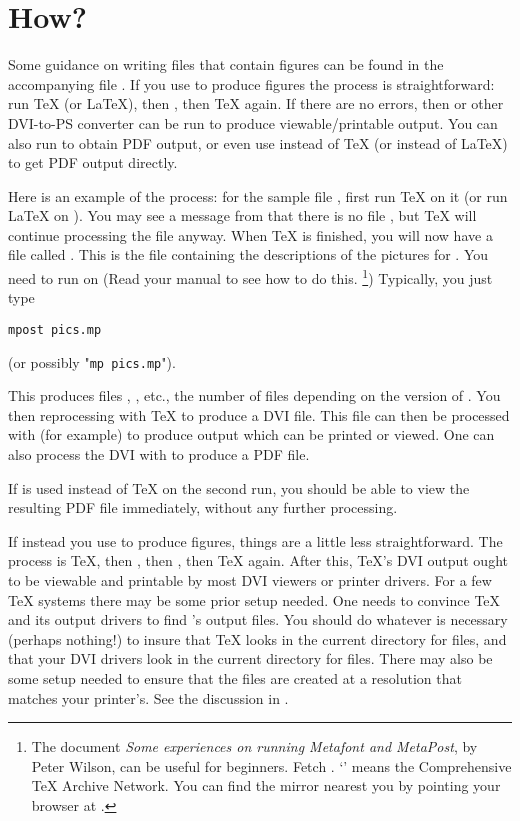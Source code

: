 \documentclass[letterpaper]{article}
\begin{document}
\section{How?}\label{process}

Some guidance on writing files that contain \mfp{} figures can be found
in the accompanying file . If you use \mfp{} to
produce \MP{} figures the process is straightforward: run \TeX{} (or
\LaTeX), then \MP{}, then \TeX{} again. If there are no errors, then
 or other DVI-to-PS converter can be run to produce
viewable\slash printable output. You can also run  to obtain PDF
output, or even use \pdfTeX{} instead of \TeX{} (or \pdfLaTeX{} instead
of \LaTeX{}) to get PDF output directly.

Here is an example of the process: for the sample file
, first run \TeX{} on it (or run \LaTeX{} on
). You may see a message from \mfp{} that there is
no file , but \TeX{} will continue processing the file
anyway. When \TeX{} is finished, you will now have a file called
. This is the \MP{} file containing the descriptions of
the pictures for . You need to run \MP{} on
 (Read your \MF{} manual to see how to do
this.%
    \footnote{The document \textit{Some experiences on running Metafont
    and MetaPost}, by Peter Wilson, can be useful for beginners. Fetch
    . `' means the Comprehensive
    \TeX{} Archive Network. You can find the mirror nearest you by
    pointing your browser at .}) %
Typically, you just type
\begin{verbatim}
mpost pics.mp
\end{verbatim}
(or possibly "\verb$mp pics.mp$").

This produces files , , etc., the number of
files depending on the version of . You then
reprocessing  with \TeX{} to produce a DVI file. This
file can then be processed with  (for example) to produce
\PS{} output which can be printed or viewed. One can also process the
DVI with  to produce a PDF file.

If \pdfTeX{} is used instead of \TeX{} on the second run, you should be
able to view the resulting PDF file immediately, without any further
processing.

If instead you use \mfp{} to produce \MF{} figures, things are a little
less straightforward. The process is \TeX{}, then \MF{}, then
, then \TeX{} again. After this, \TeX{}'s DVI output ought
to be viewable and printable by most DVI viewers or printer drivers. For
a few \TeX{} systems there may be some prior setup needed. One needs to
convince \TeX{} and its output drivers to find \MF{}'s output files. You
should do whatever is necessary (perhaps nothing!) to insure that \TeX{}
looks in the current directory for  files, and that your DVI
drivers look in the current directory for  files. There may
also be some setup needed to ensure that the  files are
created at a resolution that matches your printer's. See the discussion
in .
\end{document}
